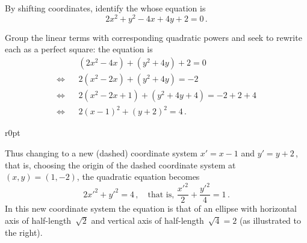 \begin{example} 
By shifting coordinates, identify the  whose equation is
\begin{equation*}
2x^2+y^2-4x+4y+2=0\,.
\end{equation*}
\begin{solution} 
Group the linear terms with corresponding quadratic powers and seek to rewrite each as a perfect square: the equation is
\begin{eqnarray*}&&
(2x^2-4x)+(y^2+4y)+2=0
\\\iff&&
2(x^2-2x)+(y^2+4y)=-2
\\\iff&&
2(x^2-2x+1)+(y^2+4y+4)=-2+2+4
\\\iff&&
2(x-1)^2+(y+2)^2=4\,.
\end{eqnarray*}

\begin{wrapfigure}r{0pt}
\end{wrapfigure}
Thus changing to a new (dashed) coordinate system \(x'=x-1\) and \(y'=y+2\)\,, that is, choosing the origin of the dashed coordinate system at \((x,y)=(1,-2)\), the quadratic equation becomes
\begin{equation*}
2{x'}^2+{y'}^2=4\,, \quad\text{that is, }
\frac{{x'}^2}{2}+\frac{{y'}^2}{4}=1\,.
\end{equation*}
In this new coordinate system the equation is that of an ellipse with horizontal axis of half-length~\(\sqrt2\) and vertical axis of half-length~\(\sqrt4=2\) (as illustrated to the right).
\end{solution}
\end{example}


